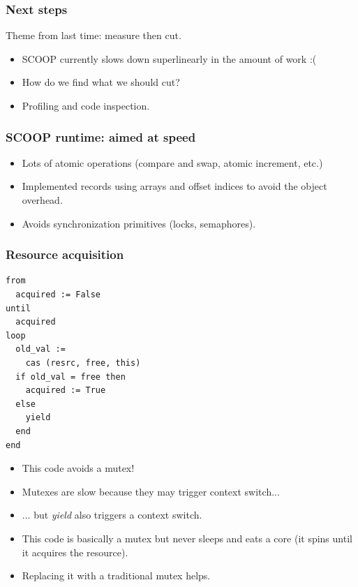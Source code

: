 \documentclass{beamer}
\begin{document}
\begin{frame}
  \frametitle{Next steps}
  Theme from last time: measure then cut.
  \begin{itemize}[<+->]
  \item SCOOP currently slows down superlinearly in the amount of work :(
  \item How do we find what we should cut? 
  \item Profiling and code inspection.
  \end{itemize}
\end{frame}

\begin{frame}
  \frametitle{SCOOP runtime: aimed at speed}
  
  \begin{itemize}
  \item Lots of atomic operations (compare and swap, atomic increment, etc.)
  \item Implemented records using arrays and offset indices to 
    avoid the object overhead.
  \item Avoids synchronization primitives (locks, semaphores).
  \end{itemize}  
\end{frame}

\begin{frame}[fragile]
  \frametitle{Resource acquisition}
  
  \begin{minipage}[c]{0.45\linewidth}
  \begin{lstlisting}
from
  acquired := False
until 
  acquired
loop
  old_val :=
    cas (resrc, free, this)
  if old_val = free then
    acquired := True
  else
    yield
  end
end
  \end{lstlisting}
\end{minipage}
\begin{minipage}[c]{0.45\linewidth}
  \begin{itemize}[<+->]
  \item This code avoids a mutex!
  \item Mutexes are slow because they may trigger context switch...
  \item ... but \emph{yield} also triggers a context switch.
  \item This code is basically a mutex but never sleeps and
    eats a core (it spins until it acquires the resource).
  \item Replacing it with a traditional mutex helps.
  \end{itemize}
\end{minipage}
\end{frame}
\end{document}
